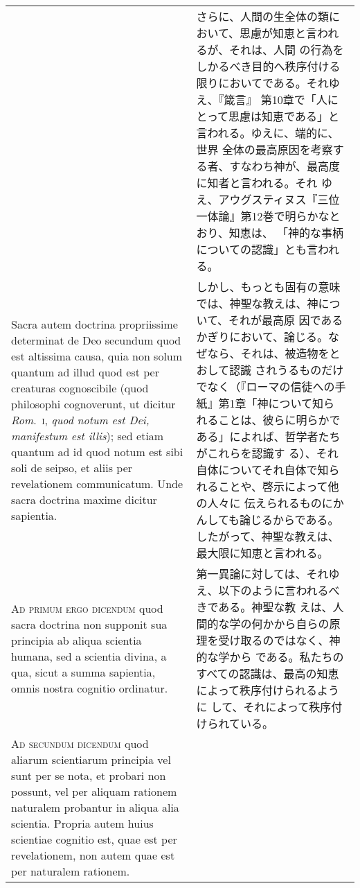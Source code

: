 \documentclass[10pt]{jsarticle}
\begin{document}
\begin{longtable}{p{21em}p{21em}}
&


さらに、人間の生全体の類において、思慮が知恵と言われるが、それは、人間
の行為をしかるべき目的へ秩序付ける限りにおいてである。それゆえ、『箴言』
第10章で「人にとって思慮は知恵である」と言われる。ゆえに、端的に、世界
全体の最高原因を考察する者、すなわち神が、最高度に知者と言われる。それ
ゆえ、アウグスティヌス『三位一体論』第12巻で明らかなとおり、知恵は、
「神的な事柄についての認識」とも言われる。

\\


Sacra autem doctrina propriissime determinat de Deo secundum quod est
altissima causa, quia non solum quantum ad illud quod est per
creaturas cognoscibile (quod philosophi cognoverunt, ut dicitur
{\itshape Rom}.~{\scshape i}, {\itshape quod notum est Dei, manifestum
est illis}); sed etiam quantum ad id quod notum est sibi soli de
seipso, et aliis per revelationem communicatum. Unde sacra doctrina
maxime dicitur sapientia.


&

しかし、もっとも固有の意味では、神聖な教えは、神について、それが最高原
因であるかぎりにおいて、論じる。なぜなら、それは、被造物をとおして認識
されうるものだけでなく（『ローマの信徒への手紙』第1章「神について知ら
れることは、彼らに明らかである」によれば、哲学者たちがこれらを認識す
る）、それ自体についてそれ自体で知られることや、啓示によって他の人々に
伝えられるものにかんしても論じるからである。したがって、神聖な教えは、
最大限に知恵と言われる。


\\


{\scshape Ad primum ergo dicendum} quod sacra doctrina non supponit
sua principia ab aliqua scientia humana, sed a scientia divina, a qua,
sicut a summa sapientia, omnis nostra cognitio ordinatur.


&

第一異論に対しては、それゆえ、以下のように言われるべきである。神聖な教
えは、人間的な学の何かから自らの原理を受け取るのではなく、神的な学から
である。私たちのすべての認識は、最高の知恵によって秩序付けられるように
して、それによって秩序付けられている。


\\


{\scshape Ad secundum dicendum} quod aliarum scientiarum principia vel
sunt per se nota, et probari non possunt, vel per aliquam rationem
naturalem probantur in aliqua alia scientia. Propria autem huius
scientiae cognitio est, quae est per revelationem, non autem quae est
per naturalem rationem.



\end{longtable}
\end{document}
